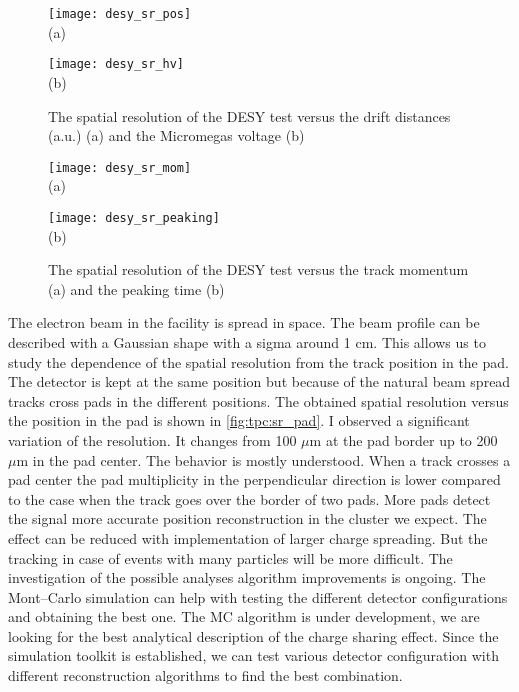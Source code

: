 \documentclass[../main.tex]{subfiles}
\begin{document}
\begin{figure}[!ht]
  \centering
  \begin{minipage}{0.49\linewidth}
    \centering
    \texttt{[image: desy\_sr\_pos]} \\ (a)
  \end{minipage}
  \begin{minipage}{0.49\linewidth}
    \centering
    \texttt{[image: desy\_sr\_hv]} \\ (b)
  \end{minipage}
  \caption{The spatial resolution of the DESY test versus the drift distances (a.u.) (a) and the Micromegas voltage (b)}
  \label{fig:tpc:sr1}
\end{figure}

\begin{figure}[!ht]
  \centering
  \begin{minipage}{0.49\linewidth}
    \centering
    \texttt{[image: desy\_sr\_mom]} \\ (a)
  \end{minipage}
  \begin{minipage}{0.49\linewidth}
    \centering
    \texttt{[image: desy\_sr\_peaking]} \\ (b)
  \end{minipage}
  \caption{The spatial resolution of the DESY test versus the track momentum (a) and the peaking time (b)}
  \label{fig:tpc:sr2}
\end{figure}

The electron beam in the facility is spread in space. The beam profile can be described with a Gaussian shape with a sigma around 1 cm. This allows us to study the dependence of the spatial resolution from the track position in the pad. The detector is kept at the same position but because of the natural beam spread tracks cross pads in the different positions. The obtained spatial resolution versus the position in the pad is shown in \autoref{fig:tpc:sr_pad}. I observed a significant variation of the resolution. It changes from 100 $\mu\text{m}$ at the pad border up to 200 $\mu\text{m}$ in the pad center. The behavior is mostly understood. When a track crosses a pad center the pad multiplicity in the perpendicular direction is lower compared to the case when the track goes over the border of two pads. More pads detect the signal more accurate position reconstruction in the cluster we expect. The effect can be reduced with implementation of larger charge spreading. But the tracking in case of events with many particles will be more difficult. The investigation of the possible analyses algorithm improvements is ongoing. The Mont--Carlo simulation can help with testing the different detector configurations and obtaining the best one. The MC algorithm is under development, we are looking for the best analytical description of the charge sharing effect. Since the simulation toolkit is established, we can test various detector configuration with different reconstruction algorithms to find the best combination.
\end{document}
